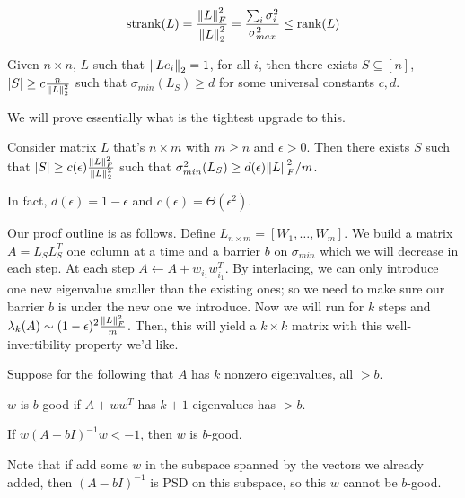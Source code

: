 \begin{definition}
    \[ \operatorname*{strank}(L) = \frac{\norm{L}_F^2}{\norm{L}_2^2} =\frac{ \sum_i \sigma_i^2 }{\sigma_{max}^2} \le \rank(L) \]
\end{definition}

\begin{theorem}
    Given $n \times n$, $L$
    such that $\norm{L e_i }_2 = 1$, for all $i$,
    then there exists $S \subseteq [n]$, $|S| \ge c \frac{n}{\norm{L}_2^2}$
    such that $\sigma_{min}(L_S) \ge d$ for some universal constants $c, d$.
\end{theorem}

We will prove essentially what is the tightest upgrade to this.

\begin{theorem}
   Consider matrix $L$ that's $n \times m$ with $m \ge n$ and $\epsilon > 0$.
   Then there exists $S$ such that $|S| \ge c(\epsilon) \frac{\norm{L}_F^2}{\norm{L}_2^2}$
   such that $\sigma_{min}^2(L_S) \ge d(\epsilon) \norm{L}_F^2/m$.
   
   In fact, $d(\epsilon) = 1 - \epsilon$ and $c(\epsilon) = \Theta(\epsilon^2)$.
\end{theorem}

Our proof outline is as follows. Define $L_{n \times m} = [W_1 ,\dots, W_m]$.
We build a matrix $A = L_S L_S^T$ one column at a time and a barrier $b$ on $\sigma_{min}$ which we will decrease in each step.
At each step $A \gets A + w_{i_1} w_{i_1}^T$. By interlacing, we can only introduce one new eigenvalue smaller than the existing ones;
so we need to make sure our barrier $b$ is under the new one we introduce.
Now we will run for $k$ steps and $\lambda_k(A) \sim (1 - \epsilon)^2 \frac{\norm{L}_F^2}{m}$.
Then, this will yield a $k \times k$ matrix with this well-invertibility property we'd like.

Suppose for the following that $A$ has $k$ nonzero eigenvalues, all $> b$.
\begin{definition}
    $w$ is $b$-good if $A + ww^T$ has $k +1$
    eigenvalues has $> b$.
\end{definition}

\begin{lemma}
    If $w(A - bI)^{-1} w < -1$, then $w$ is $b$-good.
\end{lemma}

Note that if add some $w$ in the subspace spanned by the vectors
we already added, then $(A - bI)^{-1}$ is PSD on this subspace, so this $w$
cannot be $b$-good.


